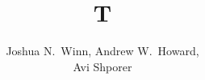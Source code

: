 \documentclass{emulateapj}
\begin{document}
\title{T}
\author{Joshua N.\ Winn, Andrew W.\ Howard,\\
Avi Shporer}
\maketitle
\end{document}
